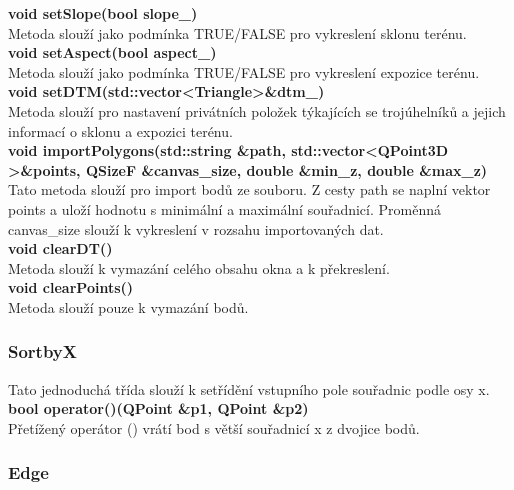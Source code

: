 \documentclass[a4paper,11pt,twoside]{article}
\begin{document}
\noindent\textbf{void setSlope(bool slope\_)}\\
Metoda slouží jako podmínka TRUE/FALSE pro vykreslení sklonu terénu.\\

\noindent\textbf{void setAspect(bool aspect\_)}\\
Metoda slouží jako podmínka TRUE/FALSE pro vykreslení expozice terénu.\\

\noindent\textbf{void setDTM(std::vector\textless Triangle\textgreater \&dtm\_)}\\
Metoda slouží pro  nastavení privátních položek týkajících se trojúhelníků a jejich informací o sklonu a expozici terénu.\\

\noindent\textbf{void importPolygons(std::string \&path, std::vector\textless QPoint3D \textgreater \&points,  QSizeF \&canvas\_size, double \&min\_z, double \&max\_z)}\\
Tato metoda slouží pro import bodů ze souboru. Z cesty path se naplní vektor points a uloží hodnotu s minimální a maximální souřadnicí. Proměnná canvas\_size slouží k vykreslení v rozsahu importovaných dat.\\

\noindent\textbf{void clearDT()}\\
Metoda slouží k vymazání celého obsahu okna a k překreslení.\\

\noindent\textbf{void clearPoints()}\\
Metoda slouží pouze k vymazání bodů.\\

\subsubsection{SortbyX}

Tato jednoduchá třída slouží k setřídění vstupního pole souřadnic podle osy x.\\

\noindent\textbf{bool operator()(QPoint \&p1, QPoint \&p2)}\\
Přetížený operátor () vrátí bod s větší souřadnicí x z dvojice bodů.\\

\newpage
\vspace*{-1cm}
\subsubsection{Edge}
\end{document}
